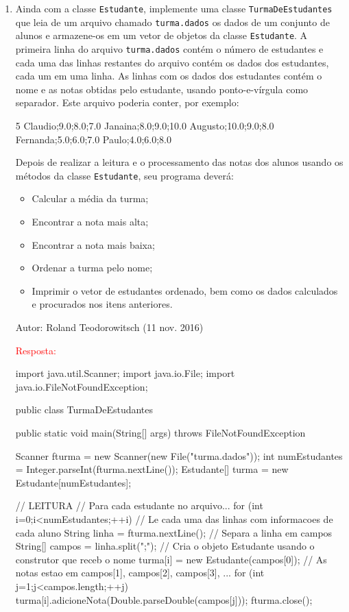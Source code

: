 \documentclass[onecolumn,a4paper,10pt]{report}
\newcommand{\+}{\, + \,}
\newcommand{\<}{\hspace*{-0.4cm}}
\begin{document}
\begin{enumerate}
\item Ainda com a classe \texttt{Estudante}, implemente uma classe \texttt{TurmaDeEstudantes} que leia de um arquivo chamado \texttt{turma.dados} os dados de um conjunto de alunos e armazene-os em um vetor de objetos da classe \texttt{Estudante}. A primeira linha do arquivo \texttt{turma.dados} contém o número de estudantes e cada uma das linhas restantes do arquivo contém os dados dos estudantes, cada um em uma linha. As linhas com os dados dos estudantes contém o nome e as notas obtidas pelo estudante, usando ponto-e-vírgula como separador. Este arquivo poderia conter, por exemplo:\\
\begin{javacode}
5
Claudio;9.0;8.0;7.0
Janaina;8.0;9.0;10.0
Augusto;10.0;9.0;8.0
Fernanda;5.0;6.0;7.0
Paulo;4.0;6.0;8.0
\end{javacode}
Depois de realizar a leitura e o processamento das notas dos alunos usando os métodos da classe \texttt{Estudante}, seu programa deverá:
\begin{itemize}
\item Calcular a média da turma;
\item Encontrar a nota mais alta;
\item Encontrar a nota mais baixa;
\item Ordenar a turma pelo nome;
\item Imprimir o vetor de estudantes ordenado, bem como os dados calculados e procurados nos itens anteriores.
\end{itemize}
{\tiny Autor: Roland Teodorowitsch (11 nov. 2016)}
\newpage
{\tiny \textcolor{red}{Resposta:}\\
\begin{javacode}
import java.util.Scanner;
import java.io.File;
import java.io.FileNotFoundException;

public class TurmaDeEstudantes {
    
    public static void main(String[] args) throws FileNotFoundException {
        Scanner fturma = new Scanner(new File("turma.dados"));
        int numEstudantes = Integer.parseInt(fturma.nextLine());
        Estudante[] turma = new Estudante[numEstudantes];
        
        // LEITURA
        // Para cada estudante no arquivo...
        for (int i=0;i<numEstudantes;++i) {
            // Le cada uma das linhas com informacoes de cada aluno
            String linha = fturma.nextLine();
            // Separa a linha em campos
            String[] campos = linha.split(";");
            // Cria o objeto Estudante usando o construtor que receb o nome
            turma[i] = new Estudante(campos[0]);
            // As notas estao em campos[1], campos[2], campos[3], ...
            for (int j=1;j<campos.length;++j) {
                turma[i].adicioneNota(Double.parseDouble(campos[j]));
            }
        }
        fturma.close();
        
}}
\end{javacode}}
\end{enumerate}
\end{document}
